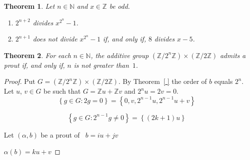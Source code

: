 \documentclass[12pt]{article}
\newcommand{\bZ}{\mathbb{Z}}
\newcommand{\bN}{\mathbb{N}} %
\newtheorem{theorem}{Theorem}
\theoremstyle{definition}
\begin{document}
 

 \begin{theorem}
   Let $n \in \bN$ and $x \in \bZ$ be odd.
   \begin{enumerate}
   \item $2^{n + 2}$ divides $x^{2^n} - 1$.
   \item $2^{n + 1}$ does not divide $x^{2^n} - 1$ if, and only if, $8$ divides $x - 5$.
   \end{enumerate}  
 \end{theorem}


 

 \begin{theorem}
   For each $n \in \bN$, the  additive group  $(\bZ / 2^n \bZ) \times (\bZ / 2 \bZ)$ admits a prout
   if, and only if, $n$ is not greater than~$1$.
 \end{theorem}

 \begin{proof}
   Put $G = (\bZ / 2^n \bZ) \times (\bZ / 2 \bZ)$.
   By Theorem~\ref{ } the order of $b$ equals $2^n$.
   Let $u$, $v \in G$ be such that $G = \bZ u + \bZ v$ and $2^n u = 2 v = 0$.
   $$
   \left\{ g \in G : 2 g = 0 \right\}  = \left\{ 0, v, 2^{n - 1} u, 2^{n - 1} u + v  \right\} 
   $$

   $$
   \left\{ g \in G : 2^{n - 1} g \ne 0 \right\}  = \left\{ (2 k + 1) u  \right\} 
   $$
   

   Let $(\alpha, b)$ be a prout of~
   $b = i u + j v$
   
   $\alpha(b) =  k u + v $
    

  
   

 
   
   
 

 
   


   
   





   
   
 \end{proof}
 
\end{document}
